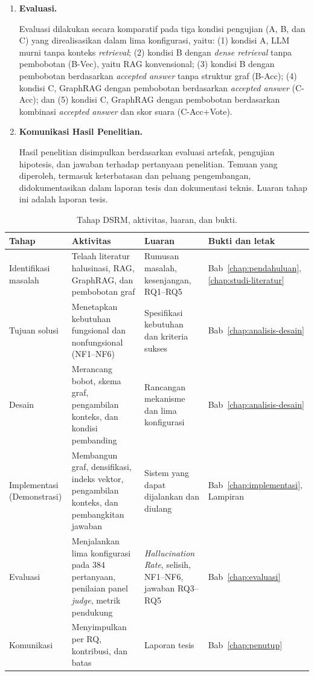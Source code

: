 \begin{enumerate}
    \item \textbf{Evaluasi.}

    Evaluasi dilakukan secara komparatif pada tiga kondisi pengujian (A, B, dan C) yang direalisasikan dalam lima konfigurasi, yaitu: (1) kondisi A, LLM murni tanpa konteks \emph{retrieval}; (2) kondisi B dengan \emph{dense retrieval} tanpa pembobotan (B-Vec), yaitu RAG konvensional; (3) kondisi B dengan pembobotan berdasarkan \emph{accepted answer} tanpa struktur graf (B-Acc); (4) kondisi C, GraphRAG dengan pembobotan berdasarkan \emph{accepted answer} (C-Acc); dan (5) kondisi C, GraphRAG dengan pembobotan berdasarkan kombinasi \emph{accepted answer} dan skor suara (C-Acc+Vote).
    
    \item \textbf{Komunikasi Hasil Penelitian.}

    Hasil penelitian disimpulkan berdasarkan evaluasi artefak, pengujian hipotesis, dan jawaban terhadap pertanyaan penelitian. Temuan yang diperoleh, termasuk keterbatasan dan peluang pengembangan, didokumentasikan dalam laporan tesis dan dokumentasi teknis. Luaran tahap ini adalah laporan tesis.
\end{enumerate}

\begin{table}[!htbp]
\centering
\small
\caption{Tahap DSRM, aktivitas, luaran, dan bukti.}
\label{tab:dsrm-matriks}
\renewcommand{\arraystretch}{1.2}
\begin{tabularx}{\textwidth}{|>{\raggedright\arraybackslash}p{2.7cm}|>{\raggedright\arraybackslash}X|>{\raggedright\arraybackslash}X|>{\raggedright\arraybackslash}p{2.9cm}|}
\hline
\textbf{Tahap} & \textbf{Aktivitas} & \textbf{Luaran} & \textbf{Bukti dan letak} \\
\hline
Identifikasi masalah & Telaah literatur halusinasi, RAG, GraphRAG, dan pembobotan graf & Rumusan masalah, kesenjangan, RQ1--RQ5 & Bab~\ref{chap:pendahuluan}, \ref{chap:studi-literatur} \\
\hline
Tujuan solusi & Menetapkan kebutuhan fungsional dan nonfungsional (NF1--NF6) & Spesifikasi kebutuhan dan kriteria sukses & Bab~\ref{chap:analisis-desain} \\
\hline
Desain & Merancang bobot, skema graf, pengambilan konteks, dan kondisi pembanding & Rancangan mekanisme dan lima konfigurasi & Bab~\ref{chap:analisis-desain} \\
\hline
Implementasi (Demonstrasi) & Membangun graf, densifikasi, indeks vektor, pengambilan konteks, dan pembangkitan jawaban & Sistem yang dapat dijalankan dan diulang & Bab~\ref{chap:implementasi}, Lampiran \\
\hline
Evaluasi & Menjalankan lima konfigurasi pada 384 pertanyaan, penilaian panel \emph{judge}, metrik pendukung & \emph{Hallucination Rate}, selisih, NF1--NF6, jawaban RQ3--RQ5 & Bab~\ref{chap:evaluasi} \\
\hline
Komunikasi & Menyimpulkan per RQ, kontribusi, dan batas & Laporan tesis & Bab~\ref{chap:penutup} \\
\hline
\end{tabularx}
\end{table}


